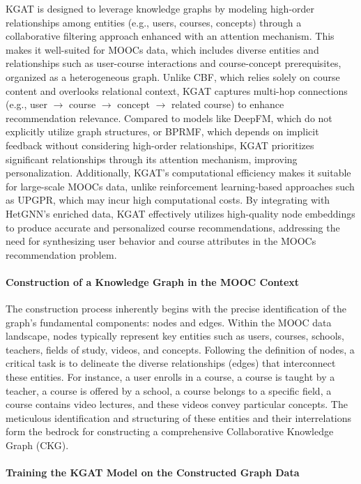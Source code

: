 \documentclass{ieeeaccess}
\begin{document}
{KGAT is designed to leverage knowledge graphs by modeling high-order relationships among entities (e.g., users, courses, concepts) through a collaborative filtering approach enhanced with an attention mechanism. This makes it well-suited for MOOCs data, which includes diverse entities and relationships such as user-course interactions and course-concept prerequisites, organized as a heterogeneous graph. Unlike CBF, which relies solely on course content and overlooks relational context, KGAT captures multi-hop connections (e.g., user \(\rightarrow\) course \(\rightarrow\) concept \(\rightarrow\) related course) to enhance recommendation relevance. Compared to models like DeepFM, which do not explicitly utilize graph structures, or BPRMF, which depends on implicit feedback without considering high-order relationships, KGAT prioritizes significant relationships through its attention mechanism, improving personalization. Additionally, KGAT’s computational efficiency makes it suitable for large-scale MOOCs data, unlike reinforcement learning-based approaches such as UPGPR, which may incur high computational costs. By integrating with HetGNN’s enriched data, KGAT effectively utilizes high-quality node embeddings to produce accurate and personalized course recommendations, addressing the need for synthesizing user behavior and course attributes in the MOOCs recommendation problem.
}

\paragraph{Construction of a Knowledge Graph in the MOOC Context}

The construction process inherently begins with the precise identification of the graph's fundamental components: nodes and edges. Within the MOOC data landscape, nodes typically represent key entities such as users, courses, schools, teachers, fields of study, videos, and concepts. Following the definition of nodes, a critical task is to delineate the diverse relationships (edges) that interconnect these entities. For instance, a user enrolls in a course, a course is taught by a teacher, a course is offered by a school, a course belongs to a specific field, a course contains video lectures, and these videos convey particular concepts. The meticulous identification and structuring of these entities and their interrelations form the bedrock for constructing a comprehensive Collaborative Knowledge Graph (CKG).

\paragraph{Training the KGAT Model on the Constructed Graph Data}
\end{document}
